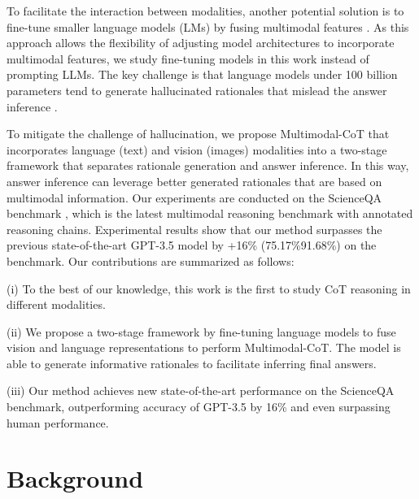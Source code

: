\documentclass[nohyperref]{article}
\theoremstyle{plain}
\theoremstyle{definition}
\theoremstyle{remark}
\begin{document}
{To facilitate the interaction between modalities, another potential solution is to fine-tune smaller language models (LMs) by fusing multimodal features \citep{zhang2023universal}. As this approach allows the flexibility of adjusting model architectures to incorporate multimodal features, we study fine-tuning models in this work instead of prompting LLMs. The key challenge is that language models under 100 billion parameters tend to generate hallucinated rationales that mislead the answer inference \citep{ho2022large,magister2022teaching,ji2022survey}.}



{To mitigate the challenge of hallucination, we propose Multimodal-CoT that incorporates language (text) and vision (images) modalities into a two-stage framework that separates rationale generation and answer inference. 
In this way, answer inference can leverage better generated rationales that are based on multimodal information.} 
Our experiments are conducted on the ScienceQA benchmark \citep{lu2022learn}, which is the latest multimodal reasoning benchmark with annotated reasoning chains. Experimental results show that our method surpasses the previous state-of-the-art GPT-3.5 model by +16\% (75.17\%91.68\%) on the benchmark. Our contributions are summarized as follows:


(i) {To the best of our knowledge, this work is the first to study CoT reasoning in different modalities.}

(ii) We propose a two-stage framework by fine-tuning language models to fuse vision and language representations to perform Multimodal-CoT. The model is able to generate informative rationales to facilitate inferring final answers.

(iii) Our method achieves new state-of-the-art performance on the ScienceQA benchmark, outperforming accuracy of GPT-3.5 by 16\% and even surpassing human performance.





















\section{Background}  
\end{document}
